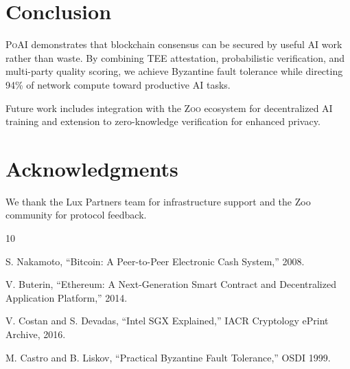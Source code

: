 \documentclass[11pt,letterpaper]{article}
\newcommand{\Zoo}{\textsc{Zoo}}
\newcommand{\PoAI}{\textsc{PoAI}}
\begin{document}
\section{Conclusion}

\PoAI{} demonstrates that blockchain consensus can be secured by useful AI work rather than waste. By combining TEE attestation, probabilistic verification, and multi-party quality scoring, we achieve Byzantine fault tolerance while directing 94\% of network compute toward productive AI tasks.

Future work includes integration with the \Zoo{} ecosystem for decentralized AI training and extension to zero-knowledge verification for enhanced privacy.

\section*{Acknowledgments}

We thank the Lux Partners team for infrastructure support and the Zoo community for protocol feedback.


\begin{thebibliography}{10}

S. Nakamoto, ``Bitcoin: A Peer-to-Peer Electronic Cash System,'' 2008.

V. Buterin, ``Ethereum: A Next-Generation Smart Contract and Decentralized Application Platform,'' 2014.

V. Costan and S. Devadas, ``Intel SGX Explained,'' IACR Cryptology ePrint Archive, 2016.

M. Castro and B. Liskov, ``Practical Byzantine Fault Tolerance,'' OSDI 1999.

\end{thebibliography}
\end{document}
